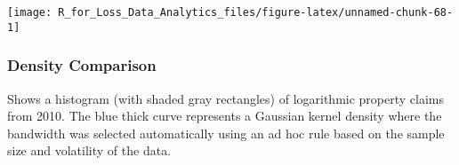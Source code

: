 \documentclass[]{book}
\newenvironment{Shaded}{\begin{snugshade}}{\end{snugshade}}
\newcommand{\KeywordTok}[1]{\textcolor[rgb]{0.13,0.29,0.53}{\textbf{#1}}}
\newcommand{\DataTypeTok}[1]{\textcolor[rgb]{0.13,0.29,0.53}{#1}}
\newcommand{\DecValTok}[1]{\textcolor[rgb]{0.00,0.00,0.81}{#1}}
\newcommand{\StringTok}[1]{\textcolor[rgb]{0.31,0.60,0.02}{#1}}
\newcommand{\CommentTok}[1]{\textcolor[rgb]{0.56,0.35,0.01}{\textit{#1}}}
\newcommand{\OperatorTok}[1]{\textcolor[rgb]{0.81,0.36,0.00}{\textbf{#1}}}
\newcommand{\NormalTok}[1]{#1}
\theoremstyle{definition}
\theoremstyle{definition}
\theoremstyle{definition}
\theoremstyle{remark}
\begin{document}
\begin{Shaded}
\end{Shaded}

\begin{center}\texttt{[image: R\_for\_Loss\_Data\_Analytics\_files/figure-latex/unnamed-chunk-68-1]} \end{center}

\subsubsection{Density Comparison}\label{density-comparison}

Shows a histogram (with shaded gray rectangles) of logarithmic property
claims from 2010. The blue thick curve represents a Gaussian kernel
density where the bandwidth was selected automatically using an ad hoc
rule based on the sample size and volatility of the data.
\end{document}
